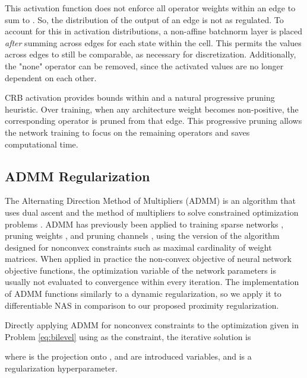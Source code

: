 \documentclass[letterpaper]{article} \usepackage{aaai22}  \usepackage{times}  \usepackage{helvet}  \usepackage{courier}  \usepackage[hyphens]{url}  \usepackage{graphicx} \urlstyle{rm} \def\UrlFont{\rm}  \usepackage{natbib}  \usepackage{caption} \DeclareCaptionStyle{ruled}{labelfont=normalfont,labelsep=colon,strut=off} \frenchspacing  \setlength{\pdfpagewidth}{8.5in}  \setlength{\pdfpageheight}{11in}  \usepackage{algorithm}
\begin{document}
\iffalse
\begin{wrapfigure}{r}{1.6in}
\texttt{[image: images/clamp.png]}
\caption{Clipped ReLU} \label{img:clamp}
\end{wrapfigure}
\fi

This activation function does not enforce all operator weights within an edge to sum to . So, the distribution of the output of an edge is not as regulated. To account for this in activation distributions, a non-affine batchnorm layer is placed \textit{after} summing across edges for each state within the cell. This permits the  values across edges to still be comparable, as necessary for discretization. Additionally, the "none" operator can be removed, since the activated  values are no longer dependent on each other.

CRB activation provides bounds within  and a natural progressive pruning heuristic. Over training, when any architecture weight becomes non-positive, the corresponding operator is pruned from that edge. This progressive pruning allows the network training to focus on the remaining operators and saves computational time.

\subsection{ADMM Regularization}
The Alternating Direction Method of Multipliers (ADMM) is an algorithm that uses dual ascent and the method of multipliers to solve constrained optimization problems \cite{boyd2010}. ADMM has previously been applied to training sparse networks \cite{kiaee2016alternating}, pruning weights \cite{zhang2018structadmm,ye2018progressive}, and pruning channels \cite{ma2019}, using the version of the algorithm designed for nonconvex constraints such as maximal cardinality of weight matrices. When applied in practice the non-convex objective of neural network objective functions, the optimization variable of the network parameters is usually not evaluated to convergence within every iteration. The implementation of ADMM functions similarly to a dynamic regularization, so we apply it to differentiable NAS in comparison to our proposed proximity regularization.

Directly applying ADMM for nonconvex constraints \cite{boyd2010} to the optimization given in Problem \ref{eq:bilevel} using  as the constraint, the iterative solution is

where  is the projection onto ,  and  are introduced variables, and  is a regularization hyperparameter.
\end{document}
